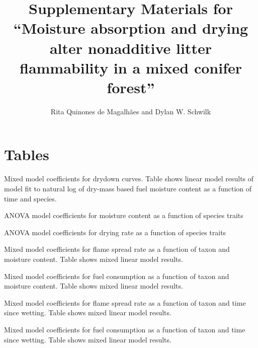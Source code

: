 \documentclass[letterpaper]{article}
\title{Supplementary Materials for ``Moisture absorption and drying alter nonadditive litter flammability in a mixed conifer forest''}
\author{Rita Quinones de Magalh\~{a}es and Dylan W. Schwilk}
\date{}
\begin{document}
\maketitle

\section*{Tables}

\begin{table}[H]
  \caption{Mixed model coefficients for drydown curves. Table shows linear model results of model fit to  natural log of dry-mass based fuel moisture content as a function of time and species.} 
  \label{tabS1}
\centering

\end{table}

\begin{table}[H]
  \caption{ANOVA model coefficients for moisture content as a function of species traits} 
  \label{tabS2}
\centering

\end{table}

\begin{table}[H]
  \caption{ANOVA model coefficients for drying rate as a function of species traits} 
  \label{tabS3}
\centering

\end{table}

\begin{table}[H]
  \caption{Mixed model coefficients for flame spread rate as a function of taxon and moisture content. Table shows mixed linear model results.} 
  \label{tabS4}
\centering

\end{table}

\begin{table}[H]
  \caption{Mixed model coefficients for fuel consumption as a function of taxon and moisture content. Table shows mixed linear model results.} 
  \label{tabS5}
\centering

\end{table}


\begin{table}[H]
  \caption{Mixed model coefficients for flame spread rate as a function of taxon and time since wetting. Table shows mixed linear model results.} 
  \label{tabS6}
\centering

\end{table}

\begin{table}[H]
  \caption{Mixed model coefficients for fuel consumption as a function of taxon and time since wetting. Table shows mixed linear model results.} 
  \label{tabS7}
\centering

\end{table}
\end{document}
